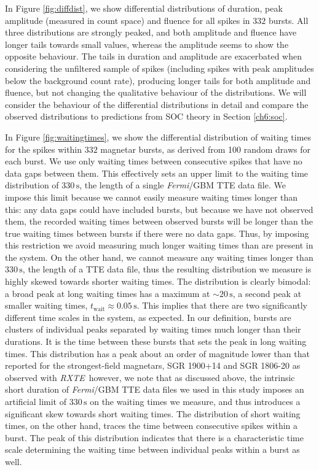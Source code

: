 \documentclass[12pt]{emulateapj}
\newcommand{\project}[1]{\textsl{#1}}
\newcommand{\fermi}{\project{Fermi}}
\newcommand{\rxte}{\project{RXTE}}
\begin{document}
 In Figure \ref{fig:diffdist}, we show differential distributions of duration, peak amplitude (measured in count space) and fluence for all spikes in $332$ bursts. All three distributions are
 strongly peaked, and both amplitude and fluence have longer tails towards small values, whereas the amplitude seems to show the opposite behaviour. The 
 tails in duration and amplitude are exacerbated when considering the unfiltered sample of 
 spikes (including spikes with peak amplitudes below the background count rate), producing longer tails for both amplitude and fluence, but not changing the qualitative behaviour 
 of the distributions. We will consider the behaviour of
 the differential distributions in detail and compare the observed distributions to predictions from SOC theory in Section \ref{ch6:soc}.

In Figure \ref{fig:waitingtimes}, we show the differential distribution of waiting times for the spikes within $332$ magnetar bursts, as derived from 100 random draws for each burst. We use only waiting times 
between consecutive spikes that have no data gaps between them. This effectively sets an upper limit to the waiting time distribution of $330\,\mathrm{s}$,
the length of a single \fermi/GBM TTE data file. We impose this limit because we cannot easily measure waiting times longer than this: any data gaps could 
have included bursts, but because we have not observed them, the recorded waiting times between observed bursts will be longer than the true waiting times
between bursts if there were no data gaps. Thus, by imposing this restriction we avoid measuring much longer waiting times than are present in the system.
On the other hand, we cannot measure any waiting times longer than $330\,\mathrm{s}$, the length of a TTE data file, thus the resulting distribution we measure is
highly skewed towards shorter waiting times.
 The distribution is clearly bimodal: a broad peak at long waiting times has a maximum at $\sim\!\! 20 \,\mathrm{s}$, a
second peak at smaller waiting times, $t_\mathrm{wait} \approx 0.05 \,\mathrm{s}$. This implies that there are two significantly different time scales
in the system, as expected. In our definition, bursts are clusters of individual peaks separated by
waiting times much longer than their durations. It is the time between these bursts that sets the peak in long waiting times. This distribution has a peak about
an order of magnitude lower than that reported for the strongest-field magnetars, SGR 1900+14 \citep{gogus1999} and SGR 1806-20 \citep{gogus2000} as observed
with \rxte\, however, we note that as discussed above, the intrinsic short duration of \fermi/GBM TTE data files we used in this study imposes an 
artificial limit of $330\,\mathrm{s}$ on the waiting times we measure,
and thus introduces a significant skew towards short waiting times. 
The distribution of short waiting times, on the other hand, traces the time between consecutive spikes within a burst. The peak of this distribution indicates
that there is a characteristic time scale determining the waiting time between individual peaks within a burst as well. 
\end{document}
